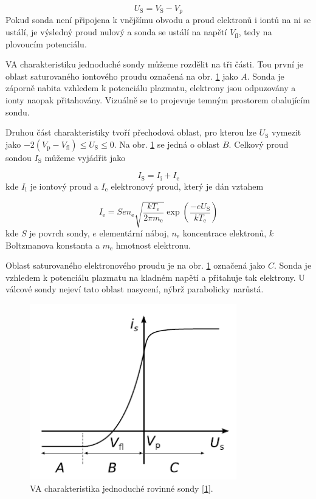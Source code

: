 \documentclass[a4paper,12pt]{article}
\begin{document}
\begin{equation}
	U_\text{S} = V_\text{S} - V_\text{p}
	\label{Usondy}
\end{equation}
Pokud sonda není připojena k vnějšímu obvodu a proud elektronů i iontů na ni se ustálí, je výsledný proud nulový a sonda se ustálí na napětí $V_\text{{fl}}$, tedy na plovoucím potenciálu.

VA charakteristiku jednoduché sondy můžeme rozdělit na tři části. Tou první je oblast saturovaného iontového proudu označená na obr.
\ref{VA} jako $A$. Sonda je záporně nabita vzhledem k potenciálu plazmatu, elektrony jsou odpuzovány a ionty naopak přitahovány. Vizuálně se to projevuje temným prostorem obalujícím sondu.

Druhou část charakteristiky tvoří přechodová oblast, pro kterou lze 
$U_\text{S}$ vymezit jako $-2 (V_\text{p} - V_\text{{fl}}) \leq
U_\text{S} \leq 0$. Na obr. \ref{VA} se jedná o oblast $B$. Celkový proud 
sondou $I_\text{S}$ můžeme vyjádřit jako

\begin{equation}
	I_\text{S} = I_\text{i} + I_\text{e}
\end{equation}
kde $I_\text{i}$ je iontový proud a $I_\text{e}$ elektronový proud, který je dán vztahem

\begin{equation}
	I_\text{e} = S e n_\text{e} \sqrt{\frac{k T_\text{e}}{2 \pi m_\text{e}}} \exp \left(\frac{-eU_\text{S}}{k T_\text{e}}\right)
	\label{eproud}
\end{equation}
kde $S$ je povrch sondy, $e$ elementární náboj, $n_\text{e}$ koncentrace elektronů, $k$ Boltzmanova konstanta a $m_\text{e}$ hmotnost
elektronu.

Oblast saturovaného elektronového proudu je na obr. \ref{VA} označená jako $C$. Sonda je vzhledem k potenciálu plazmatu na kladném
napětí a přitahuje tak elektrony. U válcové sondy nejeví tato oblast nasycení, nýbrž parabolicky narůstá.


\begin{figure}[h]
	\centering
	\includegraphics[width=90mm]{VA.png}
	\caption{VA charakteristika jednoduché rovinné sondy [\ref{VA}].}
	\label{VA}
\end{figure}	
\newpage
\end{document}
